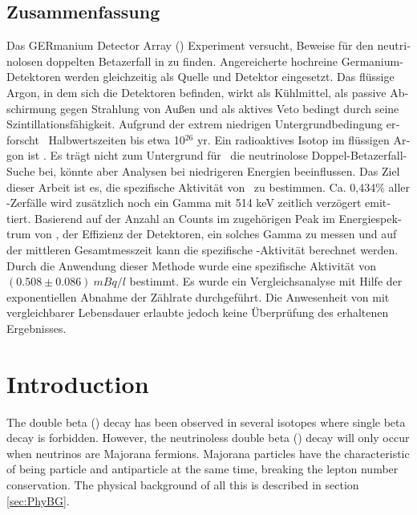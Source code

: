 \documentclass[encoding=utf8,british]{tumphthesis}
\begin{document}
\begin{otherlanguage}{ngerman}
\chapter*{Zusammenfassung}
Das GERmanium Detector Array (\gerda) Experiment versucht, Beweise für den neutrinolosen doppelten Betazerfall in  zu finden.
Angereicherte hochreine Germanium-Detektoren werden gleichzeitig als Quelle und Detektor eingesetzt.
Das flüssige Argon, in dem sich die Detektoren befinden, wirkt als Kühlmittel, als passive Abschirmung gegen Strahlung von Außen und als aktives Veto bedingt durch seine Szintillationsfähigkeit.
Aufgrund der extrem niedrigen Untergrundbedingung erforscht \gerda\ Halbwertszeiten bis etwa 10$^{26}$ yr.
Ein radioaktives Isotop im flüssigen Argon ist .
Es trägt nicht zum Untergrund für \gerdas\ die neutrinolose Doppel-Betazerfall-Suche bei, könnte aber Analysen bei niedrigeren Energien beeinflussen.
Das Ziel dieser Arbeit ist es, die spezifische Aktivität von \Kr\ zu bestimmen.
Ca. 0,434$\%$ aller \Kr-Zerfälle wird zusätzlich noch ein Gamma mit 514 keV zeitlich verzögert  emittiert.
Basierend auf der Anzahl an Counts im zugehörigen Peak im Energiespektrum von \gerda, der Effizienz der Detektoren, ein solches Gamma zu messen und auf der mittleren Gesamtmesszeit kann die spezifische \Kr-Aktivität berechnet werden.
Durch die Anwendung dieser Methode wurde eine spezifische Aktivität von $(0.508\pm0.086) \   \unit{mBq}/ \unit{l}$ bestimmt.
Es wurde ein Vergleichsanalyse mit Hilfe der exponentiellen Abnahme der Zählrate durchgeführt.
Die Anwesenheit von  mit vergleichbarer Lebensdauer erlaubte jedoch keine Überprüfung des erhaltenen Ergebnisses.

\end{otherlanguage}

\tableofcontents

\mainmatter

\chapter{Introduction}
\label{sec:intro}

The double beta (\twonu) decay has been observed in several isotopes where single beta decay is forbidden.
However, the neutrinoless double beta (\onbb) decay will only occur when neutrinos are Majorana fermions.
Majorana particles have the characteristic of being particle and antiparticle at the same time, breaking the lepton number conservation.
The physical background of all this is described in section \ref{sec:PhyBG}.
\\
\end{document}
